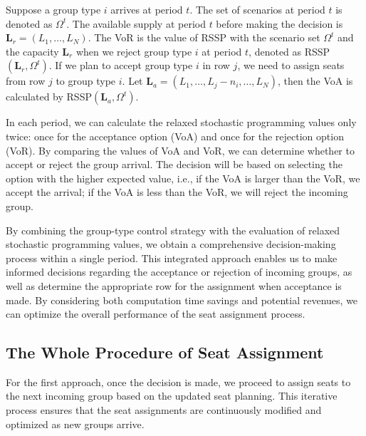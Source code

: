 Suppose a group type $i$ arrives at period $t$. The set of scenarios at period $t$ is denoted as $\Omega^{t}$. The available supply at period $t$ before making the decision is $\mathbf{L}_{r} = (L_1, \ldots, L_N)$. The VoR is the value of RSSP with the scenario set $\Omega^{t}$ and the capacity $\mathbf{L}_{r}$ when we reject group type $i$ at period $t$, denoted as RSSP$(\mathbf{L}_{r}, \Omega^{t})$. If we plan to accept group type $i$ in row $j$, we need to assign seats from row $j$ to group type $i$. Let $\mathbf{L}_{a}= (L_1, \ldots, L_j-n_{i}, \ldots, L_N)$, then the VoA is calculated by RSSP$(\mathbf{L}_{a}, \Omega^{t})$.

In each period, we can calculate the relaxed stochastic programming values only twice: once for the acceptance option (VoA) and once for the rejection option (VoR). By comparing the values of VoA and VoR, we can determine whether to accept or reject the group arrival. The decision will be based on selecting the option with the higher expected value, i.e., if the VoA is larger than the VoR, we accept the arrival; if the VoA is less than the VoR, we will reject the incoming group.



By combining the group-type control strategy with the evaluation of relaxed stochastic programming values, we obtain a comprehensive decision-making process within a single period. This integrated approach enables us to make informed decisions regarding the acceptance or rejection of incoming groups, as well as determine the appropriate row for the assignment when acceptance is made. By considering both computation time savings and potential revenues, we can optimize the overall performance of the seat assignment process.



\subsection{The Whole Procedure of Seat Assignment}
For the first approach, once the decision is made, we proceed to assign seats to the next incoming group based on the updated seat planning. This iterative process ensures that the seat assignments are continuously modified and optimized as new groups arrive.

